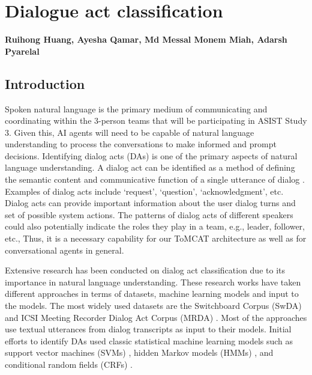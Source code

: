 \chapter{Dialogue act classification}
\label{ch:da_classification}
\textbf{Ruihong Huang, Ayesha Qamar, Md Messal Monem Miah, Adarsh Pyarelal}

\section{Introduction}

Spoken natural language is the primary medium of communicating and coordinating
within the 3-person teams that will be participating in ASIST Study 3.  Given
this, AI agents will need to be capable of natural language understanding to
process the conversations to make informed and prompt decisions. Identifying
dialog acts (DAs) is one of the primary aspects of natural language
understanding. A dialog act can be identified as a method of defining the
semantic content and communicative function of a single utterance of dialog
\citep{Searle:1969}. Examples of dialog acts include `request', `question',
`acknowledgment', etc.
Dialog acts can provide important information about the user dialog turns and
set of possible system actions. The patterns of dialog acts
of different speakers could also potentially indicate the roles they play in a
team, e.g., leader, follower, etc., Thus, it is a necessary capability for our
ToMCAT architecture as well as for conversational agents in general.


Extensive research has been conducted on dialog act classification due to its
importance in natural language understanding. These research works have taken
different approaches in terms of datasets, machine learning models and input to
the models. The most widely used datasets are the Switchboard
Corpus (SwDA) and ICSI Meeting Recorder Dialog Act Corpus (MRDA)
\citep{Shriberg.ea:2004}. Most of the approaches use textual utterances from
dialog transcripts as input to their models. Initial efforts to identify DAs
used classic statistical machine learning models
such as support vector machines (SVMs) \citep{Henderson.ea:2012}, hidden Markov
models (HMMs) \citep{Stolcke.ea:2000}, and conditional random fields (CRFs)
\citep{Zimmermann:2009}.

